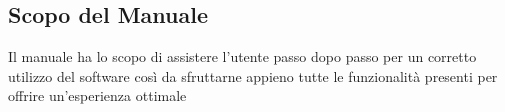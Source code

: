 \subsection{Scopo del Manuale}
Il manuale ha lo scopo di assistere l’utente passo dopo passo per un corretto utilizzo del
software così da sfruttarne appieno tutte le funzionalità presenti per offrire un’esperienza
ottimale